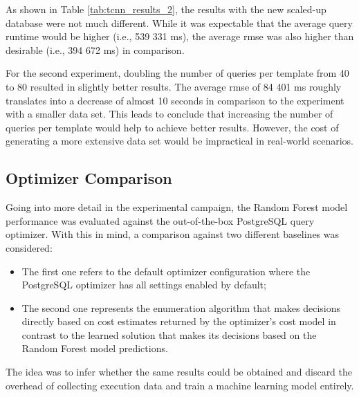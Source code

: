 As shown in Table \ref{tab:tcnn_results_2}, the results with the new scaled-up database were not much different. While it was expectable that the average query runtime would be higher (i.e., 539 331 ms), the average \gls{rmse} was also higher than desirable (i.e., 394 672 ms) in comparison.

For the second experiment, doubling the number of queries per template from 40 to 80 resulted in slightly better results. The average \gls{rmse} of 84 401 ms roughly translates into a decrease of almost 10 seconds in comparison to the experiment with a smaller data set. This leads to conclude that increasing the number of queries per template would help to achieve better results. However, the cost of generating a more extensive data set would be impractical in real-world scenarios.

\subsection{Optimizer Comparison}

Going into more detail in the experimental campaign, the Random Forest model performance was evaluated against the out-of-the-box PostgreSQL query optimizer. With this in mind, a comparison against two different baselines was considered:

\begin{itemize}
    \item The first one refers to the default optimizer configuration where the PostgreSQL optimizer has all settings enabled by default;
    \item The second one represents the enumeration algorithm that makes decisions directly based on cost estimates returned by the optimizer's cost model in contrast to the learned solution that makes its decisions based on the Random Forest model predictions.
\end{itemize}

The idea was to infer whether the same results could be obtained and discard the overhead of collecting execution data and train a machine learning model entirely.

